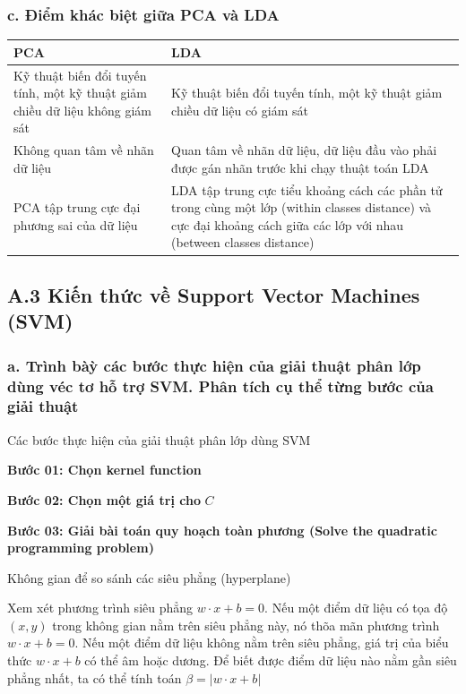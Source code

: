 \documentclass{article}
\newcommand\T{\rule{0pt}{2.6ex}}       %
\newcommand\B{\rule[-1.2ex]{0pt}{0pt}} %
\begin{document}
	\subsubsection{c. Điểm khác biệt giữa PCA và LDA}
	\begin{table}[H]
		\centering
		\begin{tabular}{| p{5cm} | p{5cm} |}\hline
		PCA	& LDA \T\B\\\hline
		Kỹ thuật biến đổi tuyến tính, một kỹ thuật giảm chiều dữ liệu không giám sát	& Kỹ thuật biến đổi tuyến tính, một kỹ thuật giảm chiều dữ liệu có giám sát\T\B\\\hline
		Không quan tâm về nhãn dữ liệu & Quan tâm về nhãn dữ liệu, dữ liệu đầu vào phải được gán nhãn trước khi chạy thuật toán LDA\T\B\\\hline
		PCA tập trung cực đại phương sai của dữ liệu & LDA tập trung cực tiểu khoảng cách các phần tử trong cùng một lớp (within classes distance) và cực đại khoảng cách giữa các lớp với nhau (between classes distance)\T\B\\\hline
		\end{tabular}
	\end{table}
	
	\subsection{A.3 Kiến thức về Support Vector Machines (SVM)}
	\subsubsection{a. Trình bàỳ các bước thực hiện của giải thuật phân lớp dùng véc tơ hỗ trợ SVM. Phân tích cụ thể từng bước của giải thuật}
	\qquad Các bước thực hiện của giải thuật phân lớp dùng SVM
	
	\textbf{Bước 01: Chọn kernel function}
	
	\textbf{Bước 02: Chọn một giá trị cho} $C$
	
	\textbf{Bước 03: Giải bài toán quy hoạch toàn phương (Solve the quadratic programming problem)}
	
	Không gian để so sánh các siêu phẳng (hyperplane)
	
	Xem xét phương trình siêu phẳng $w \cdot x + b = 0$. Nếu một điểm dữ liệu có tọa độ $(x, y)$ trong không gian nằm trên siêu phẳng này, nó thõa mãn phương trình $w \cdot x + b = 0$. Nếu một điểm dữ liệu không nằm trên siêu phẳng, giá trị của biểu thức $w \cdot x + b$ có thể âm hoặc dương. Để biết được điểm dữ liệu nào nằm gần siêu phẳng nhất, ta có thể tính toán $\beta = |w \cdot x + b|$
	
\end{document}
